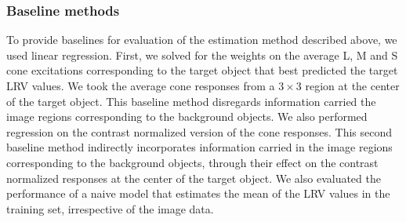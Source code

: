 \documentclass{jov}
\begin{document}
\subsubsection*{Baseline methods}

To provide baselines for evaluation of the estimation method described above, we used linear regression.
First, we solved for the weights on the average L, M and S cone excitations corresponding to the target object that best predicted the target LRV values.
We took the average cone responses from a $3 \times 3$ region at the center of the target object.
This baseline method disregards information carried the image regions corresponding to the background objects.
We also performed regression on the contrast normalized version of the cone responses.
This second baseline method indirectly incorporates information carried in the image regions corresponding to the background objects,
through their effect on the contrast normalized responses at the center of the target object. 
We also evaluated the performance of a naive model that estimates the mean of the LRV values in the training set, irrespective
of the image data.
\end{document}
